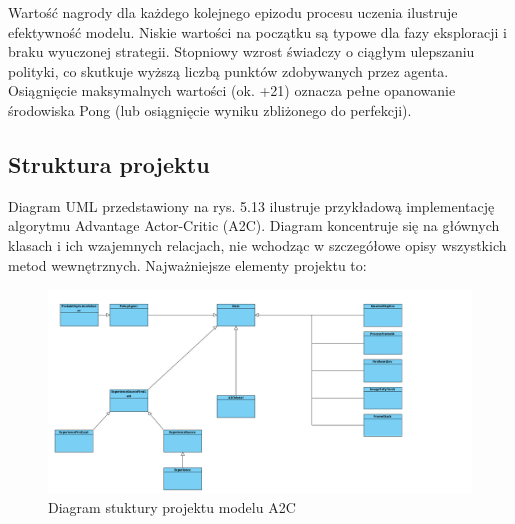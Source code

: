\documentclass[a4paper, 12pt]{article}
\numberwithin{equation}{section}
\begin{document}
    Wartość nagrody dla każdego kolejnego epizodu procesu uczenia ilustruje efektywność modelu.
    Niskie wartości na początku są typowe dla fazy eksploracji i braku wyuczonej strategii. Stopniowy wzrost świadczy o ciągłym ulepszaniu polityki, co skutkuje wyższą liczbą punktów zdobywanych przez agenta.
    Osiągnięcie maksymalnych wartości (ok. +21) oznacza pełne opanowanie środowiska Pong (lub osiągnięcie wyniku zbliżonego do perfekcji).
    \subsection{Struktura projektu}
    Diagram UML przedstawiony na rys. 5.13 ilustruje przykładową implementację algorytmu Advantage Actor-Critic (A2C). Diagram koncentruje się na głównych klasach i ich wzajemnych relacjach, nie wchodząc w szczegółowe opisy wszystkich metod wewnętrznych. Najważniejsze elementy projektu to:
    \begin{figure}[H]
        \centering
        \includegraphics[width=\textwidth]{pictures/A2C_diagram.png}
        \caption{Diagram stuktury projektu modelu A2C}
    \end{figure}
\end{document}
